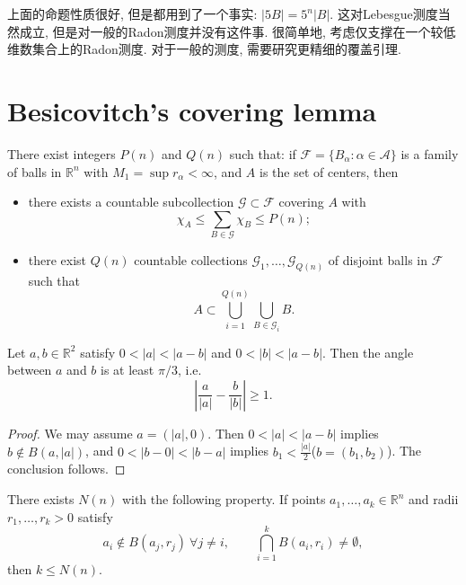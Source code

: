 \begin{remark}
上面的命题性质很好, 但是都用到了一个事实: $\lvert 5B \rvert=5^{n}\lvert B \rvert$. 这对Lebesgue测度当然成立, 但是对一般的Radon测度并没有这件事. 很简单地, 考虑仅支撑在一个较低维数集合上的Radon测度. 对于一般的测度, 需要研究更精细的覆盖引理.
\end{remark}

\section{Besicovitch's covering lemma}
\begin{theorem}\label{thm:Besicovitch}
There exist integers $P(n)$ and $Q(n)$ such that: if $\mathscr{F}=\{B_{\alpha}:\alpha\in\mathcal{A}\}$ is a family of balls in $\mathbb{R}^{n}$ with $M_{1}=\sup r_{\alpha}<\infty$, and $A$ is the set of centers, then
\begin{itemize}
\item[(i)] there exists a countable subcollection $\mathscr{G}\subset\mathscr{F}$ covering $A$ with
$$\chi_{A}\le \sum_{B\in\mathscr{G}}\chi_{B}\le P(n);$$
\item[(ii)] there exist $Q(n)$ countable collections $\mathscr{G}_{1},\dots,\mathscr{G}_{Q(n)}$ of disjoint balls in $\mathscr{F}$ such that
$$A\subset \bigcup_{i=1}^{Q(n)}\bigcup_{B\in\mathscr{G}_{i}}B.$$
\end{itemize}
\end{theorem}

\begin{lemma}\label{lem:angle}
Let $a,b\in\mathbb{R}^{2}$ satisfy $0<|a|<|a-b|$ and $0<|b|<|a-b|$. Then the angle between $a$ and $b$ is at least $\pi/3$, i.e.
$$\left\lvert \frac{a}{|a|}-\frac{b}{|b|} \right\rvert\ge 1.
$$
\end{lemma}

\begin{proof}
    We may assume $a=(\lvert a \rvert,0).$ Then $0<\lvert a \rvert<\lvert a-b \rvert$ implies $b \notin B(a,\lvert a \rvert)$, and $0<\lvert b-0 \rvert<\lvert b-a \rvert$ implies $b_{1}< \frac{\lvert a \rvert}{2}$($b=(b_{1},b_{2})$). The conclusion follows.
\end{proof}

\begin{lemma}\label{lem:finite-overlap}
There exists $N(n)$ with the following property. If points $a_{1},\dots,a_{k}\in\mathbb{R}^{n}$ and radii $r_{1},\dots,r_{k}>0$ satisfy
$$a_{i}\notin B(a_{j},r_{j})\ \forall j\neq i,\qquad \bigcap_{i=1}^{k}B(a_{i},r_{i})\neq\emptyset,$$
then $k\le N(n)$.
\end{lemma}

